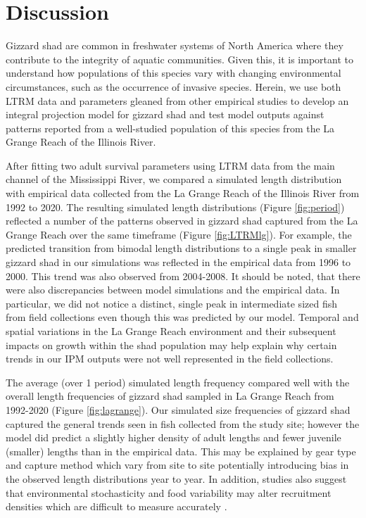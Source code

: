 \documentclass[preprint,review,12pt,authoryear]{elsarticle}
\begin{document}
\section{Discussion}
Gizzard shad are common in freshwater systems of North America where they contribute to the integrity of aquatic communities. 
Given this, it is important to understand how populations of this species vary with changing environmental circumstances, such as the occurrence of invasive species. 
Herein, we use both LTRM data and parameters gleaned from other empirical studies to develop an integral projection model for gizzard shad and test model outputs against patterns reported from a well-studied population of this species from the La Grange Reach of the Illinois River.   

After fitting two adult survival parameters using LTRM data from the main channel of the Mississippi River, we compared a simulated length distribution with empirical data collected from the La Grange Reach of the Illinois River from 1992 to 2020. 
The resulting simulated length distributions (Figure \ref{fig:period}) reflected a number of the patterns observed in gizzard shad captured from the La Grange Reach over the same timeframe (Figure \ref{fig:LTRMlg}). For example, the predicted transition from bimodal length distributions to a single peak in smaller gizzard shad in our simulations was reflected in the empirical data from  1996 to 2000.  This trend was also observed from 2004-2008.  It should be noted, that there were also discrepancies between model simulations and the empirical data.  In particular, we did not notice a distinct, single peak in intermediate sized fish from field collections even though this was predicted by our model. Temporal and spatial variations in the La Grange Reach environment and their subsequent impacts on growth within the shad population may help explain why certain trends in our IPM outputs were not well represented in the field collections.   

The average (over 1 period) simulated length frequency compared well with the overall length frequencies of gizzard shad sampled in La Grange Reach from 1992-2020 (Figure \ref{fig:lagrange}). 
Our simulated size frequencies of gizzard shad captured the general trends seen in fish collected from the study site; however the model did predict a slightly higher density of adult lengths and fewer juvenile (smaller) lengths than in the empirical data. 
This may be explained by gear type and capture method which vary from site to site potentially introducing bias in the observed length distributions year to year.
In addition, studies also suggest that environmental stochasticity and food variability may alter recruitment densities which are difficult to measure accurately \citep{rose2000quantitative, okamoto2016stochastic}. 
\end{document}
